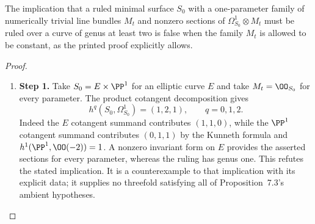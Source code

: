 \begin{proposition}\hypertarget{tag-01AR}{}\label{cdp:st:A.4.2}

The implication that a ruled minimal surface $S_0$ with a one-parameter family of numerically trivial line bundles $M_t$ and nonzero sections of $\Omega^1_{S_0}\otimes M_t$ must be ruled over a curve of genus at least two is false when the family $M_t$ is allowed to be constant, as the printed proof explicitly allows.
\end{proposition}


\begin{proof}
\begin{enumerate}[label={$\langle1\rangle$\arabic*.},leftmargin=*]
\item 
\noindent\textbf{Step 1.} Take $S_0=E\times\PP^1$ for an elliptic curve $E$ and take $M_t=\OO_{S_0}$ for every parameter. The product cotangent decomposition gives
\[
 h^q(S_0,\Omega^1_{S_0})=(1,2,1),\qquad q=0,1,2.
\]
Indeed the $E$ cotangent summand contributes $(1,1,0)$, while the $\PP^1$ cotangent summand contributes $(0,1,1)$ by the Kunneth formula and $h^1(\PP^1,\OO(-2))=1$. A nonzero invariant form on $E$ provides the asserted sections for every parameter, whereas the ruling has genus one. This refutes the stated implication. It is a counterexample to that implication with its explicit data; it supplies no threefold satisfying all of Proposition~7.3's ambient hypotheses.

\end{enumerate}
\end{proof}